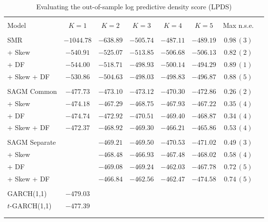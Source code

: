 \documentclass[10pt]{beamer}
\begin{document}
\begin{frame}[plain]
\footnotesize{
\begin{center}
\begin{table} 
\begin{tabular}{lccccccc}
 &  &  &  &  &  &  & \tabularnewline
\hline
\hline 
 &  &  &  &  &  &  & \tabularnewline
Model & $K=1$ & $K=2$ & $K=3$ & $K=4$ & $K=5$   & Max n.s.e.\tabularnewline
\hline
 &  &  &  &  &   & \tabularnewline
SMR & $-1044.78$ & $-638.89$ & $-505.74$ & $-487.11$ & $-489.19$   & $0.98\,(3)$\tabularnewline
+ Skew & $-540.91$ & $-525.07$ & $-513.85$ & $-506.68$ & $-506.13$  & $0.82\,(2)$\tabularnewline
+ DF & $-544.00$ & $-518.71$ & $-498.93$ & $-500.14$ & $-494.29$   & $0.89\,(1)$\tabularnewline
+ Skew + DF & $-530.86$ & $-504.63$ & $-498.03$ & $-498.83$ & $-496.87$   & $0.88\,(5)$\tabularnewline
 &  &  &  &  &    & \tabularnewline
SAGM Common & $-477.73$ & $-473.10$ & $-473.12$ & $-470.30$ & $-472.86$  & $0.26\,(2)$\tabularnewline
+ Skew & $-474.18$ & $-467.29$ & $-468.75$ & $-467.93$ & $-467.22$   & $0.35\,(4)$\tabularnewline
+ DF & $-474.74$ & $-472.92$ & $-470.51$ & $-469.40$ & $-468.87$   & $0.34\,(4)$\tabularnewline
+ Skew + DF & $\mathbf{-472.37}$ & $-468.92$ & $-469.30$ & $-466.21$ & \textbf{$\mathbf{-465.86}$}   & $0.53\,(4)$\tabularnewline
 &  &  &  &  &   & \tabularnewline
SAGM Separate &  & $-469.21$ & $-469.50$ & $-470.53$ & $-471.02$   & $0.49\,(3)$\tabularnewline
+ Skew &  & $-468.48$ & $-466.93$ & $-467.48$ & $-468.02$   & $0.58\,(4)$\tabularnewline
+ DF &  & $-469.08$ & $-469.24$ & \textbf{$\mathbf{-462.03}$} & $-467.78$   & $0.72\,(5)$\tabularnewline
+ Skew + DF &  & $\mathbf{-466.84}$ & $\mathbf{-462.56}$ & $-462.47$ & $-474.58$   & $0.74\,(5)$\tabularnewline
 &  &  &  &  &    & \tabularnewline
GARCH(1,1) & $-479.03$ &  &  &  &   & \tabularnewline
$t$-GARCH(1,1) & $-477.39$ &  &  &  &   & \tabularnewline
 &  &  &  &  &   & \tabularnewline
\hline
\hline 
 &  &  &  &  &   & \tabularnewline
\end{tabular}  

\caption{\footnotesize{Evaluating the out-of-sample log predictive density score (LPDS)}}
\label{Table: LPDS}
\end{table}
\end{center} 
}
\end{frame}



\end{document}
